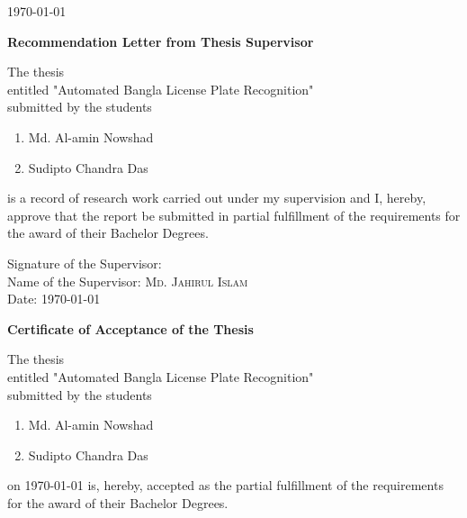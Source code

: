 \documentclass{standalone}
\begin{document}
\begin{titlepage}
\begin{center}
    \vfill
    \today
    
\end{center}

\newpage

\begin{center}
	\textbf{\huge Recommendation Letter from Thesis Supervisor}
\end{center}
	
    \vspace{0.5cm}
    
    \noindent
	The thesis\\
    entitled "{Automated Bangla License Plate Recognition}"\\
    submitted by the students
	\begin{enumerate}
		\item Md. Al-amin Nowshad
		\item Sudipto Chandra Das
	\end{enumerate}
	is a record of research work carried out under my supervision and I, hereby, approve that the report be submitted in partial fulfillment of the requirements for the award of their Bachelor Degrees.\\
	
    \vspace{4.0cm}
	
    \noindent
	Signature of the Supervisor: \\
	Name of the Supervisor: \textsc{\large Md. Jahirul Islam}\\%
	Date: \today
				
\newpage

\begin{center}
	\textbf{\huge Certificate of Acceptance of the Thesis} \\
\end{center}
	
    \vspace{0.5cm}
    
	\noindent
	The thesis\\
	entitled "{Automated Bangla License Plate Recognition}"\\
	submitted by the students
	\begin{enumerate}
		\item Md. Al-amin Nowshad
		\item Sudipto Chandra Das
	\end{enumerate}	
    on \today
    \noindent
	is, hereby, accepted as the partial fulfillment of the requirements for the award of their Bachelor Degrees.
				

\end{titlepage}
\end{document}
